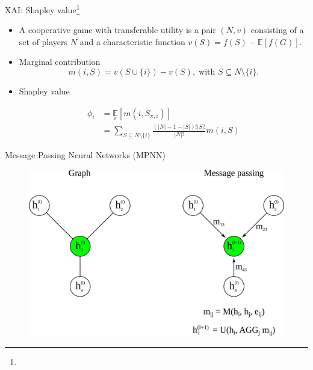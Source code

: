 \documentclass[aspectratio=169]{beamer}
\begin{document}
\begin{frame}{XAI: Shapley value\footnote[frame]{}}


    \begin{itemize}
        \item A cooperative game with transferable utility is
        a pair $(N, v)$ consisting of a set of players $N$ 
        and a characteristic function $v(S) = f(S) - \mathbb{E}[f(G)]$.


        \item Marginal contribution \begin{equation}
            m(i, S) = v\left(S \cup \{i\}\right) - v\left(S\right), \; \text{with } S \subseteq N \setminus \{i\}.
        \end{equation}

        \item Shapley value \begin{center}
            \begin{align}
                \phi_i &= \underset{\pi}{\mathbb{E}} \left[ m\left(i, S_{\pi, i} \right) \right] \\
                    &= \sum_{S \subseteq N \setminus \{i\}} \frac{\left(|N| - 1 - |S|\right)!|S|!}{|N|!} m(i, S)
            \end{align}
        \end{center}
    \end{itemize}
       
\end{frame}

 
\begin{frame}{Message Passing Neural Networks (MPNN)}

    \begin{figure}[h]
        \centering 
        \includegraphics[scale=0.85]{./img/mpnn.png}
    \end{figure}

\end{frame}
\end{document}
